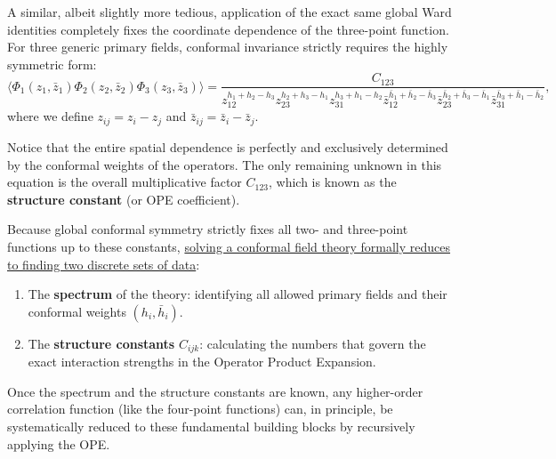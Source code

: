 A similar, albeit slightly more tedious, application of the exact same global Ward identities completely fixes the coordinate dependence of the three-point function. For three generic primary fields, conformal invariance strictly requires the highly symmetric form:
\[
    \langle \Phi_1(z_1, \bar{z}_1) \Phi_2(z_2, \bar{z}_2) \Phi_3(z_3, \bar{z}_3) \rangle = \frac{C_{123}}{z_{12}^{h_1 + h_2 - h_3} z_{23}^{h_2 + h_3 - h_1} z_{31}^{h_3 + h_1 - h_2} \bar{z}_{12}^{\bar{h}_1 + \bar{h}_2 - \bar{h}_3} \bar{z}_{23}^{\bar{h}_2 + \bar{h}_3 - \bar{h}_1} \bar{z}_{31}^{\bar{h}_3 + \bar{h}_1 - \bar{h}_2}},
\]
where we define \( z_{ij} = z_i - z_j \) and \( \bar{z}_{ij} = \bar{z}_i - \bar{z}_j \).

Notice that the entire spatial dependence is perfectly and exclusively determined by the conformal weights of the operators. The only remaining unknown in this equation is the overall multiplicative factor \( C_{123} \), which is known as the \textbf{structure constant} (or OPE coefficient).

Because global conformal symmetry strictly fixes all two- and three-point functions up to these constants, \uline{solving a conformal field theory formally reduces to finding two discrete sets of data}:
\begin{enumerate}
    \item The \textbf{spectrum} of the theory: identifying all allowed primary fields and their conformal weights \( (h_i, \bar{h}_i) \).
    \item The \textbf{structure constants} \( C_{ijk} \): calculating the numbers that govern the exact interaction strengths in the Operator Product Expansion.
\end{enumerate}
Once the spectrum and the structure constants are known, any higher-order correlation function (like the four-point functions) can, in principle, be systematically reduced to these fundamental building blocks by recursively applying the OPE.